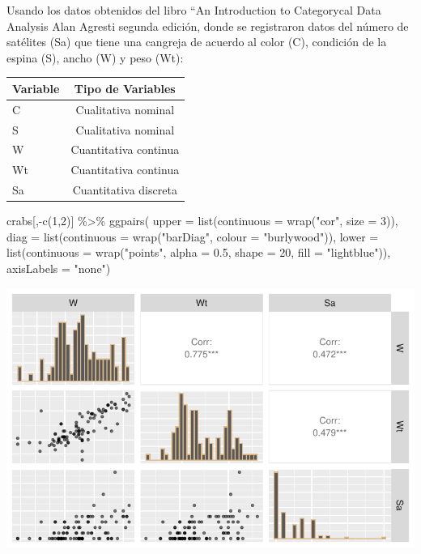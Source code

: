 \documentclass[
  letterpaper,
  DIV=11,
  numbers=noendperiod]{scrartcl}
\newenvironment{Shaded}{\begin{snugshade}}{\end{snugshade}}
\newcommand{\AttributeTok}[1]{\textcolor[rgb]{0.40,0.45,0.13}{#1}}
\newcommand{\DecValTok}[1]{\textcolor[rgb]{0.68,0.00,0.00}{#1}}
\newcommand{\FloatTok}[1]{\textcolor[rgb]{0.68,0.00,0.00}{#1}}
\newcommand{\FunctionTok}[1]{\textcolor[rgb]{0.28,0.35,0.67}{#1}}
\newcommand{\NormalTok}[1]{\textcolor[rgb]{0.00,0.23,0.31}{#1}}
\newcommand{\SpecialCharTok}[1]{\textcolor[rgb]{0.37,0.37,0.37}{#1}}
\newcommand{\StringTok}[1]{\textcolor[rgb]{0.13,0.47,0.30}{#1}}
\begin{document}
Usando los datos obtenidos del libro ``An Introduction to Categorycal
Data Analysis Alan Agresti segunda edición, donde se registraron datos
del número de satélites (Sa) que tiene una cangreja de acuerdo al color
(C), condición de la espina (S), ancho (W) y peso (Wt):

\begin{longtable}[]{@{}lc@{}}
\toprule\noalign{}
Variable & Tipo de Variables \\
\midrule\noalign{}
\endhead
\bottomrule\noalign{}
\endlastfoot
C & Cualitativa nominal \\
S & Cualitativa nominal \\
W & Cuantitativa continua \\
Wt & Cuantitativa continua \\
Sa & Cuantitativa discreta \\
\end{longtable}

\begin{Shaded}
\begin{Highlighting}[]
\NormalTok{crabs[,}\SpecialCharTok{{-}}\FunctionTok{c}\NormalTok{(}\DecValTok{1}\NormalTok{,}\DecValTok{2}\NormalTok{)] }\SpecialCharTok{\%\textgreater{}\%}
  \FunctionTok{ggpairs}\NormalTok{(}
    \AttributeTok{upper =} \FunctionTok{list}\NormalTok{(}\AttributeTok{continuous =} \FunctionTok{wrap}\NormalTok{(}\StringTok{"cor"}\NormalTok{, }\AttributeTok{size =} \DecValTok{3}\NormalTok{)),}
    \AttributeTok{diag =} \FunctionTok{list}\NormalTok{(}\AttributeTok{continuous =} \FunctionTok{wrap}\NormalTok{(}\StringTok{"barDiag"}\NormalTok{, }\AttributeTok{colour =} \StringTok{"burlywood"}\NormalTok{)),}
    \AttributeTok{lower =} \FunctionTok{list}\NormalTok{(}\AttributeTok{continuous =} \FunctionTok{wrap}\NormalTok{(}\StringTok{"points"}\NormalTok{, }\AttributeTok{alpha =} \FloatTok{0.5}\NormalTok{, }\AttributeTok{shape =} \DecValTok{20}\NormalTok{, }
                                   \AttributeTok{fill =} \StringTok{"lightblue"}\NormalTok{)),}
    \AttributeTok{axisLabels =} \StringTok{"none"}\NormalTok{)}
\end{Highlighting}
\end{Shaded}

\includegraphics[width=1\textwidth,height=\textheight]{Modelos_files/figure-pdf/unnamed-chunk-16-1.pdf}
\end{document}
